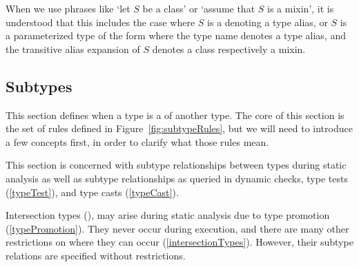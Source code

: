 \documentclass[makeidx]{article}
\begin{document}
\LMHash{}%
When we use phrases like `let $S$ be a class' or `assume that $S$ is a mixin',
it is understood that this includes the case where
$S$ is a  denoting a type alias, or
$S$ is a parameterized type of the form
where the type name denotes a type alias,
and the transitive alias expansion of $S$ denotes a class respectively a mixin.


\subsection{Subtypes}

\LMHash{}%
This section defines when a type is a  of another type.
The core of this section is the set of rules defined in
Figure~\ref{fig:subtypeRules},
but we will need to introduce a few concepts first,
in order to clarify what those rules mean.


\LMHash{}%
This section is concerned with subtype relationships between types
during static analysis
as well as subtype relationships as queried in dynamic checks,
type tests
(\ref{typeTest}),
and type casts
(\ref{typeCast}).


\LMHash{}%
Intersection types
(),
may arise during static analysis due to type promotion
(\ref{typePromotion}).
They never occur during execution,
and there are many other restrictions on where they can occur
(\ref{intersectionTypes}).
However, their subtype relations are specified without restrictions.
\end{document}
